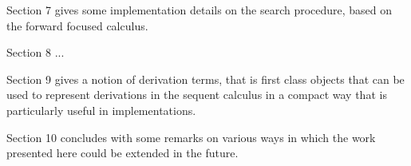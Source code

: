 Section 7 gives some implementation details on the search procedure, based on
the forward focused calculus.

Section 8 ...

Section 9 gives a notion of derivation terms, that is first class objects that
can be used to represent derivations in the sequent calculus in a compact way
that is particularly useful in implementations.

Section 10 concludes with some remarks on various ways in which the work
presented here could be extended in the future.










